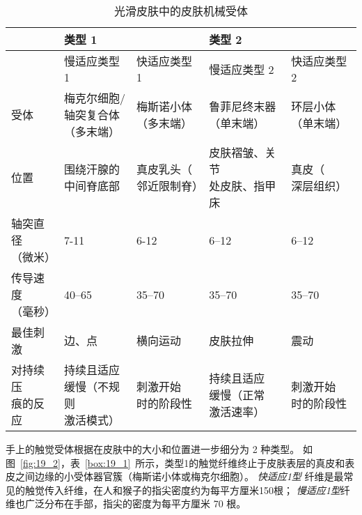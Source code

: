 \begin{table}[htbp]
	\caption{光滑皮肤中的皮肤机械受体} \label{tab:19_1} \centering
	\begin{tabular}{lllll}
		\toprule
		 & 类型 1 &  & 类型 2 & \\
		 \toprule
		 & 慢适应类型 1 & 快适应类型 1  & 慢适应类型 2 & 快适应类型 2 \\
		\midrule
		受体 & \makecell[l]{梅克尔细胞/\\轴突复合体\\（多末端）} & \makecell[l]{梅斯诺小体\\（多末端）} & \makecell[l]{鲁菲尼终末器\\（单末端）} & \makecell[l]{环层小体\\（单末端）} \\
		位置 & \makecell[l]{围绕汗腺的\\中间脊底部} & \makecell[l]{真皮乳头（\\邻近限制脊）} & \makecell[l]{皮肤褶皱、关节\\处皮肤、指甲床} & \makecell[l]{真皮（\\深层组织）} \\
		\makecell[l]{轴突直径\\（微米）} & 7-11 & 6-12 & 6–12 & 6–12 \\
		\makecell[l]{传导速度\\（毫秒）} & 40–65 & 35–70 & 35–70 & 35–70 \\
		最佳刺激 & 边、点 & 横向运动 & 皮肤拉伸 & 震动 \\
		\makecell[l]{对持续压\\痕的反应} & \makecell[l]{持续且适应\\缓慢（不规则\\激活模式）} & \makecell[l]{刺激开始\\时的阶段性} & \makecell{持续且适应\\缓慢（正常\\激活速率）} & \makecell[l]{刺激开始\\时的阶段性} \\
		\bottomrule
	\end{tabular}
\end{table}


手上的触觉受体根据在皮肤中的大小和位置进一步细分为 2 种类型。
如图~\ref{fig:19_2}，表~\ref{box:19_1}~所示，类型1的触觉纤维终止于皮肤表层的真皮和表皮之间边缘的小受体器官簇（梅斯诺小体或梅克尔细胞）。
\textit{快适应1型} 纤维是最常见的触觉传入纤维，在人和猴子的指尖密度约为每平方厘米150根；
\textit{慢适应1型}纤维也广泛分布在手部，指尖的密度为每平方厘米 70 根。


